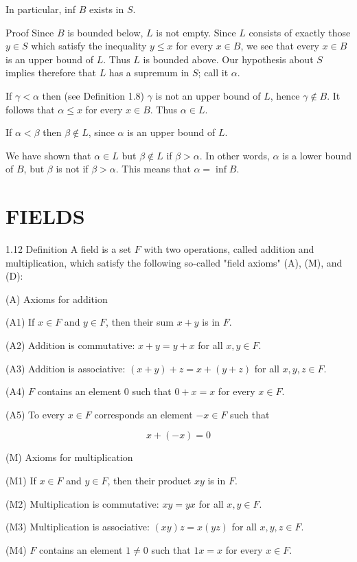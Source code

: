 \documentclass[10pt]{article}
\begin{document}
In particular, inf $B$ exists in $S$.

Proof Since $B$ is bounded below, $L$ is not empty. Since $L$ consists of exactly those $y \in S$ which satisfy the inequality $y \leq x$ for every $x \in B$, we see that every $x \in B$ is an upper bound of $L$. Thus $L$ is bounded above. Our hypothesis about $S$ implies therefore that $L$ has a supremum in $S$; call it $\alpha$.

If $\gamma<\alpha$ then (see Definition 1.8) $\gamma$ is not an upper bound of $L$, hence $\gamma \notin B$. It follows that $\alpha \leq x$ for every $x \in B$. Thus $\alpha \in L$.

If $\alpha<\beta$ then $\beta \notin L$, since $\alpha$ is an upper bound of $L$.

We have shown that $\alpha \in L$ but $\beta \notin L$ if $\beta>\alpha$. In other words, $\alpha$ is a lower bound of $B$, but $\beta$ is not if $\beta>\alpha$. This means that $\alpha=\inf B$.

\section{FIELDS}
1.12 Definition A field is a set $F$ with two operations, called addition and multiplication, which satisfy the following so-called "field axioms" (A), (M), and (D):

(A) Axioms for addition

(A1) If $x \in F$ and $y \in F$, then their sum $x+y$ is in $F$.

(A2) Addition is commutative: $x+y=y+x$ for all $x, y \in F$.

(A3) Addition is associative: $(x+y)+z=x+(y+z)$ for all $x, y, z \in F$.

(A4) $F$ contains an element 0 such that $0+x=x$ for every $x \in F$.

(A5) To every $x \in F$ corresponds an element $-x \in F$ such that

$$
x+(-x)=0
$$

(M) Axioms for multiplication

(M1) If $x \in F$ and $y \in F$, then their product $x y$ is in $F$.

(M2) Multiplication is commutative: $x y=y x$ for all $x, y \in F$.

(M3) Multiplication is associative: $(x y) z=x(y z)$ for all $x, y, z \in F$.

(M4) $F$ contains an element $1 \neq 0$ such that $1 x=x$ for every $x \in F$.
\end{document}
